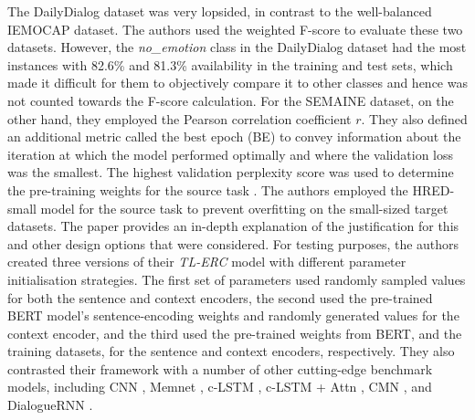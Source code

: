  The DailyDialog dataset was very lopsided, in contrast to the well-balanced IEMOCAP dataset. The authors used the weighted F-score to evaluate these two datasets. However, the \textit{no\_emotion} class in the DailyDialog dataset had the most instances with 82.6\% and 81.3\% availability in the training and test sets, which made it difficult for them to objectively compare it to other classes and hence was not counted towards the F-score calculation. For the SEMAINE dataset, on the other hand, they employed the Pearson correlation coefficient $r$. They also defined an additional metric called the best epoch (BE) to convey information about the iteration at which the model performed optimally and where the validation loss was the smallest. The highest validation perplexity score was used to determine the pre-training weights for the source task \cite{Park2018AHL}. The authors employed the HRED-small model for the source task to prevent overfitting on the small-sized target datasets. The paper provides an in-depth explanation of the justification for this and other design options that were considered. For testing purposes, the authors created three versions of their \textit{TL-ERC} model with different parameter initialisation strategies. The first set of parameters used randomly sampled values for both the sentence and context encoders, the second used the pre-trained BERT model's sentence-encoding weights and randomly generated values for the context encoder, and the third used the pre-trained weights from BERT, and the training datasets, for the sentence and context encoders, respectively. They also contrasted their framework with a number of other cutting-edge benchmark models, including CNN \cite{Kim2014ConvolutionalNN}, Memnet \cite{Sukhbaatar2015EndToEndMN}, c-LSTM \cite{poria-etal-2017-context}, c-LSTM + Attn \cite{Poria2017MultilevelMA}, CMN \cite{Hazarika2018ConversationalMN}, and DialogueRNN \cite{Majumder2018DialogueRNNAA}.


